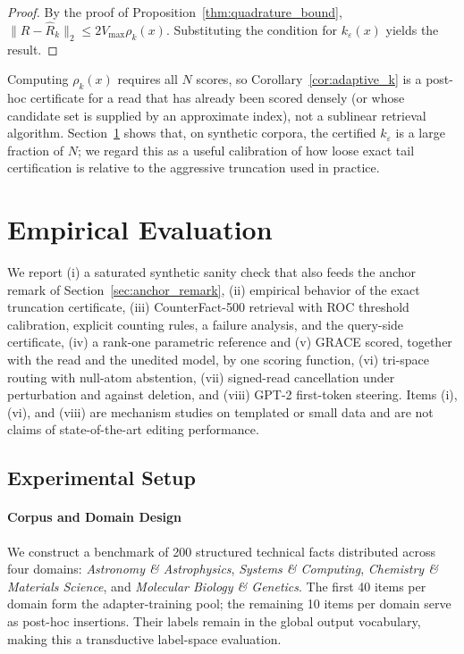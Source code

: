 \documentclass[preprint,12pt]{elsarticle}
\newcommand{\rev}[1]{#1}
\begin{document}
\begin{proof}
By the proof of Proposition~\ref{thm:quadrature_bound}, $\|R - \hat R_k\|_2 \le 2 V_{\max} \rho_k(x)$. Substituting the condition for $k_\varepsilon(x)$ yields the result. \qedhere
\end{proof}

Computing $\rho_k(x)$ requires all $N$ scores, so Corollary~\ref{cor:adaptive_k} is a post-hoc certificate for a read that has already been scored densely (or whose candidate set is supplied by an approximate index), not a sublinear retrieval algorithm. Section~\ref{sec:empirical} shows that, on synthetic corpora, the certified $k_\varepsilon$ is a large fraction of $N$; we regard this as a useful calibration of how loose exact tail certification is relative to the aggressive truncation used in practice.

\section{Empirical Evaluation}
\label{sec:empirical}

We report (i) a saturated synthetic sanity check that also feeds the anchor remark of Section~\ref{sec:anchor_remark}, (ii) empirical behavior of the exact truncation certificate, (iii) CounterFact-500 retrieval with ROC threshold calibration, \rev{explicit counting rules, a failure analysis, and the query-side certificate}, (iv) a rank-one parametric reference and (v) GRACE \rev{scored, together with the read and the unedited model, by one scoring function}, (vi) tri-space routing \rev{with null-atom abstention}, (vii) signed-read cancellation under perturbation \rev{and against deletion}, and (viii) GPT-2 first-token steering. Items (i), (vi), and (viii) are mechanism studies on templated or small data and are not claims of state-of-the-art editing performance.

\subsection{Experimental Setup}

\paragraph{Corpus and Domain Design}
We construct a benchmark of 200 structured technical facts distributed across four domains: \emph{Astronomy \& Astrophysics}, \emph{Systems \& Computing}, \emph{Chemistry \& Materials Science}, and \emph{Molecular Biology \& Genetics}. The first 40 items per domain form the adapter-training pool; the remaining 10 items per domain serve as post-hoc insertions. Their labels remain in the global output vocabulary, making this a transductive label-space evaluation.
\end{document}
